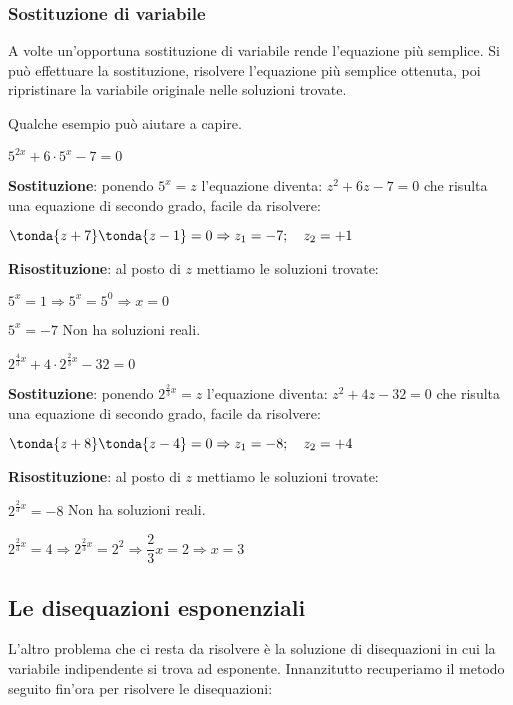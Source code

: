 \subsubsection{Sostituzione di variabile}
\label{subsubsec:esplog_sostituzione}

A volte un'opportuna sostituzione di variabile rende l'equazione più semplice. 
Si può effettuare la sostituzione, risolvere l'equazione più semplice ottenuta, 
poi ripristinare la variabile originale nelle soluzioni trovate. 

Qualche esempio può aiutare a capire.

\begin{esempio} 
\(5^{2x} +6 \cdot 5^x -7=0\) 

\textbf{Sostituzione}:
ponendo \(5^x=z\) l'equazione diventa: \(z^2 +6z -7=0\) 
che risulta una equazione di secondo grado, facile da risolvere:

\(\tonda{z+7}\tonda{z-1}=0 \Rightarrow z_1=-7; \quad z_2=+1\) 

\textbf{Risostituzione}: al posto di \(z\) mettiamo le soluzioni trovate:

\(5^x=1 \Rightarrow 5^x=5^0 \Rightarrow x=0\)

\(5^x=-7\) Non ha soluzioni reali.
\end{esempio}

\begin{esempio} 
\(2^{\frac{4}{3}x} +4 \cdot 2^{\frac{2}{3}x} -32=0\) 

\textbf{Sostituzione}:
ponendo \(2^{\frac{2}{3}x}=z\) l'equazione diventa: \(z^2 +4z -32=0\) 
che risulta una equazione di secondo grado, facile da risolvere:

\(\tonda{z+8}\tonda{z-4}=0 \Rightarrow z_1=-8; \quad z_2=+4\) 

\textbf{Risostituzione}: al posto di \(z\) mettiamo le soluzioni trovate:

\(2^{\frac{2}{3}x}=-8\) Non ha soluzioni reali.

\(2^{\frac{2}{3}x}=4 \Rightarrow 2^{\frac{2}{3}x}=2^2
\Rightarrow \dfrac{2}{3}x=2 \Rightarrow x=3\)
\end{esempio}

\subsection{Le disequazioni esponenziali}
\label{subsubsec:esplog_disequazioniesponenziali}

L'altro problema che ci resta da risolvere è la soluzione di disequazioni in 
cui la variabile indipendente si trova ad esponente. Innanzitutto recuperiamo 
il metodo seguito fin'ora per risolvere le disequazioni:

